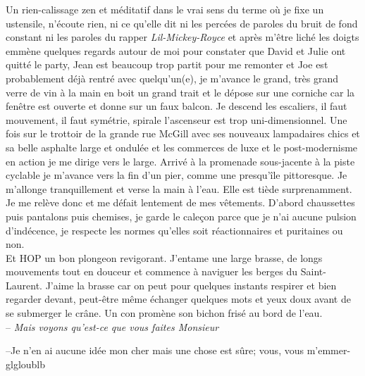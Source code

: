 Un rien-calissage zen et méditatif dans le vrai
sens du terme où je fixe un ustensile, n'écoute rien, ni ce qu'elle dit ni les
percées de paroles du bruit de fond constant ni les paroles du rapper
\textit{Lil-Mickey-Royce} 
et après m'être liché les doigts emmène quelques regards autour de moi pour
constater que David et Julie ont quitté le party, Jean est beaucoup trop partit pour me
remonter et Joe est probablement déjà rentré avec quelqu'un(e), je m'avance le 
grand, très grand verre de vin à la main en boit un grand trait et le dépose
sur une corniche car la fenêtre est ouverte et donne sur un faux balcon.
Je descend les escaliers, il faut mouvement, il faut symétrie, spirale 
l'ascenseur est trop uni-dimensionnel.
Une fois sur le trottoir de la grande rue McGill avec ses nouveaux lampadaires
chics et sa belle asphalte large et ondulée et les commerces de luxe et le
post-modernisme en action je me dirige vers le large. Arrivé à la promenade
sous-jacente à la piste cyclable je m'avance vers la fin d'un pier, comme une 
presqu'île pittoresque. Je m'allonge tranquillement et verse la main à l'eau.
Elle est tiède surprenamment. Je me relève donc et me défait lentement de mes
vêtements. D'abord chaussettes puis pantalons puis chemises, je garde le caleçon parce
que je n'ai aucune pulsion d'indécence, je respecte les normes qu'elles soit 
réactionnaires et puritaines ou non.\\

Et HOP un bon plongeon revigorant. 
J'entame une large brasse, de longs mouvements tout en douceur et commence
à naviguer les berges du Saint-Laurent.
J'aime la brasse car on peut pour quelques instants respirer et bien regarder
devant, peut-être même échanger quelques mots et yeux doux avant de se
submerger le crâne. Un con promène son bichon frisé au bord de l'eau. \\

\hfill\noindent --\textit{ Mais voyons qu'est-ce que vous faites Monsieur}

\vspace{1em}
--Je n'en ai aucune idée mon cher mais une chose est
sûre; vous, vous m'emmer-glgloublb


